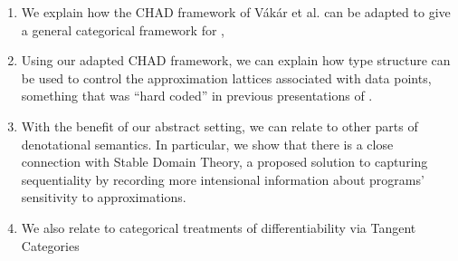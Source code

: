 \begin{enumerate}
\item We explain how the CHAD framework of Vákár et al. can be adapted to give a general categorical framework for \GPS,
\item Using our adapted CHAD framework, we can explain how type structure can be used to control the approximation lattices associated with data points, something that was ``hard coded'' in previous presentations of \GPS.
\item With the benefit of our abstract setting, we can relate \GPS to other parts of denotational semantics. In particular, we show that there is a close connection with Stable Domain Theory, a proposed solution to capturing sequentiality by recording more intensional information about programs' sensitivity to approximations.
\item We also relate \GPS to categorical treatments of differentiability via Tangent Categories 
\end{enumerate}
